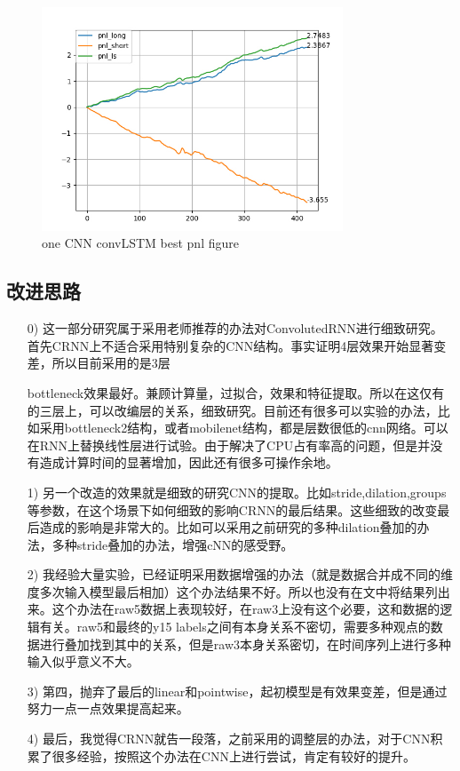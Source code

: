 \documentclass[11pt]{ctexart}
\begin{document}
\begin{figure}[H]

\begin{center}
\includegraphics[width=0.8\textwidth]{2.PNG}
\end{center}
\caption{one CNN convLSTM best pnl figure}
\label{FIG.3}
\end{figure}


\subsection{改进思路}
\begin{itemize}
  \item [0)]
    这一部分研究属于采用老师推荐的办法对ConvolutedRNN进行细致研究。首先CRNN上不适合采用特别复杂的CNN结构。事实证明4层效果开始显著变差，所以目前采用的是3层 \par bottleneck效果最好。兼顾计算量，过拟合，效果和特征提取。所以在这仅有的三层上，可以改编层的关系，细致研究。目前还有很多可以实验的办法，比如采用bottleneck2结构，或者mobilenet结构，都是层数很低的cnn网络。可以在RNN上替换线性层进行试验。由于解决了CPU占有率高的问题，但是并没有造成计算时间的显著增加，因此还有很多可操作余地。
  \item [1)]
    另一个改造的效果就是细致的研究CNN的提取。比如stride,dilation,groups等参数，在这个场景下如何细致的影响CRNN的最后结果。这些细致的改变最后造成的影响是非常大的。比如可以采用之前研究的多种dilation叠加的办法，多种stride叠加的办法，增强cNN的感受野。
  \item [2)]
    我经验大量实验，已经证明采用数据增强的办法（就是数据合并成不同的维度多次输入模型最后相加）这个办法结果不好。所以也没有在文中将结果列出来。这个办法在raw5数据上表现较好，在raw3上没有这个必要，这和数据的逻辑有关。raw5和最终的y15 labels之间有本身关系不密切，需要多种观点的数据进行叠加找到其中的关系，但是raw3本身关系密切，在时间序列上进行多种输入似乎意义不大。
  \item [3)]
    第四，抛弃了最后的linear和pointwise，起初模型是有效果变差，但是通过努力一点一点效果提高起来。
  \item [4)]
    最后，我觉得CRNN就告一段落，之前采用的调整层的办法，对于CNN积累了很多经验，按照这个办法在CNN上进行尝试，肯定有较好的提升。
\end{itemize}
\end{document}
